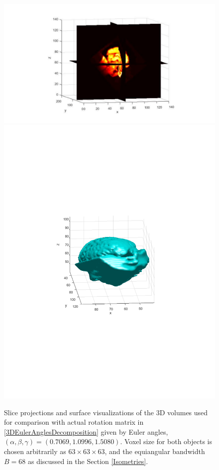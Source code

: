 \documentclass{UCF_ETD}
\begin{document}
\begin{figure}[H]
\begin{center}
\includegraphics[scale=0.4]{RobustRegistration/3DVolumeTransformedSlices}
\includegraphics[scale=0.5]{RobustRegistration/3DVolumeTransformedSurface}
\caption{Slice projections and surface visualizations of the $3$D volumes used for comparison with actual rotation matrix in \eqref{3DEulerAnglesDecomposition} given by Euler angles, $(\alpha, \beta, \gamma) = (0.7069, 1.0996, 1.5080)$. Voxel size for both objects is chosen arbitrarily as $63 \times 63 \times 63$, and the equiangular bandwidth $B = 68$ as discussed in the Section \ref{Isometries}. }
\label{3DTransformationSlices.fig}
\end{center}
\end{figure}
\end{document}
